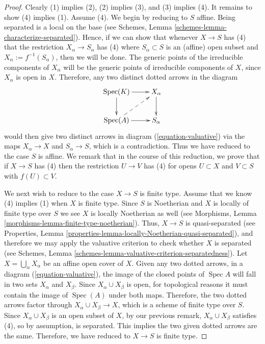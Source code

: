 \documentclass[10pt,a4paper]{amsart}
\theoremstyle{plain}
\theoremstyle{definition}
\theoremstyle{remark}
\numberwithin{equation}{subsection}
\def\Spec{\mathop{\mathrm{Spec}}}
\begin{document}
\begin{proof}
Clearly (1) implies (2), (2) implies (3), and (3) implies (4).  It
remains to show (4) implies (1). Assume (4).
We begin by reducing to $S$ affine.  Being separated is a local
on the base (see
Schemes, Lemma \ref{schemes-lemma-characterize-separated}).
Hence, if we can show that whenever
$X \to S$ has (4) that the restriction $X_\alpha \to S_\alpha$ has (4)
where $S_\alpha \subset S$ is an (affine) open subset and $X_\alpha :=
f^{-1}(S_\alpha)$, then we will be done.  The
generic points of the irreducible components of $X_\alpha$ will be the
generic points of irreducible components of $X$, since $X_\alpha$ is
open in $X$.  Therefore, any two distinct dotted arrows in the diagram
\begin{equation}
\label{equation-valuative-alpha}
\xymatrix{
\Spec(K) \ar[r] \ar[d] & X_\alpha \ar[d] \\
\Spec(A) \ar[r] \ar@{-->}[ru] & S_\alpha
}
\end{equation}
would then give two distinct arrows in diagram
(\ref{equation-valuative}) via the maps $X_\alpha \to X$ and
$S_\alpha \to S$, which is a contradiction.  Thus we have reduced
to the case $S$ is affine.  We remark that in the course of this
reduction, we prove that if $X \to S$ has (4) then the restriction $U
\to V$ has (4) for opens $U \subset X$ and $V \subset S$ with
$f(U) \subset V$.

\medskip\noindent
We next wish to reduce to the case $X \to S$ is finite type.  Assume
that we know (4) implies (1) when $X$ is finite type. Since
$S$ is Noetherian and $X$ is locally of finite type over $S$
we see $X$ is locally Noetherian as well (see Morphisms,
Lemma \ref{morphisms-lemma-finite-type-noetherian}).
Thus, $X \to S$ is quasi-separated (see
Properties, Lemma \ref{properties-lemma-locally-Noetherian-quasi-separated}),
and therefore we may apply the valuative criterion to check whether $X$
is separated (see
Schemes, Lemma \ref{schemes-lemma-valuative-criterion-separatedness}).
Let $X = \bigcup_\alpha X_\alpha$ be an affine open
cover of $X$. Given any two dotted arrows, in a diagram
(\ref{equation-valuative}), the image of the closed points of
$\Spec A$ will
fall in two sets $X_\alpha$ and $X_\beta$.  Since $X_\alpha \cup
X_\beta$ is open, for topological reasons it must contain the image of
$\Spec(A)$ under both maps. Therefore, the two dotted arrows factor
through $X_\alpha \cup X_\beta \to X$, which is a scheme of finite type over
$S$. Since $X_\alpha \cup X_\beta$ is an open subset of $X$, by our
previous remark, $X_\alpha \cup X_\beta$ satisfies (4), so by
assumption, is separated.  This implies the two given dotted
arrows are the same. Therefore, we have reduced to $X \to S$ is finite type.


\end{proof}
\end{document}
